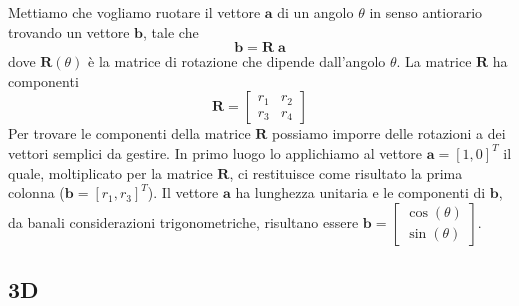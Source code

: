 \documentclass{article}
\begin{document}
Mettiamo che vogliamo ruotare il vettore $\mathbf{a}$ di un angolo $\theta$ in senso antiorario trovando un vettore $\mathbf{b}$, tale che
$$ \mathbf{b} = \mathbf{R} \; \mathbf{a} $$
dove $\mathbf{R}(\theta)$ è la matrice di rotazione che dipende dall'angolo $\theta$. La matrice $\mathbf{R}$ ha componenti
$$ \mathbf{R} = \begin{bmatrix} r_1 & r_2 \\ r_3 & r_4 \end{bmatrix} $$
Per trovare le componenti della matrice $\mathbf{R}$ possiamo imporre delle rotazioni a dei vettori semplici da gestire. In primo luogo lo applichiamo al vettore $\mathbf{a}=[1,0]^T$ il quale, moltiplicato per la matrice $\mathbf{R}$, ci restituisce come risultato la prima colonna ($\mathbf{b}=[r_1,r_3]^T$). Il vettore $\mathbf{a}$ ha lunghezza unitaria e le componenti di $\mathbf{b}$, da banali considerazioni trigonometriche, risultano essere $\mathbf{b}=\begin{bmatrix} \cos(\theta) \\ \sin(\theta) \end{bmatrix}$.

\subsection{3D}
\end{document}
